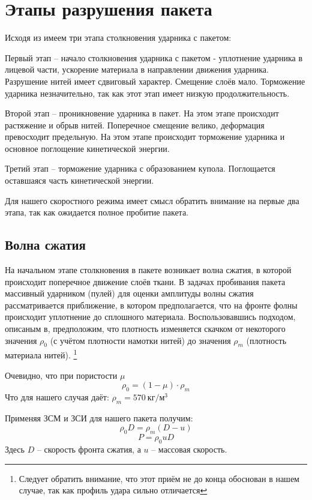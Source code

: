 \section*{Этапы разрушения пакета}
Исходя из\cite{kobylkin2014} имеем три этапа столкновения ударника с пакетом:

Первый этап -- начало столкновения ударника с пакетом - уплотнение ударника в лицевой части,
ускорение материала в направлении движения ударника.
Разрушение нитей имеет сдвиговый характер.
Смещение слоёв мало.
Торможение ударника незначительно, так как этот этап имеет низкую продолжительность.

Второй этап -- проникновение ударника в пакет.
На этом этапе происходит растяжение и обрыв нитей.
Поперечное смещение велико, деформация превосходит предельную.
На этом этапе происходит торможение ударника и основное поглощение кинетической энергии.

Третий этап -- торможение ударника с образованием купола.
Поглощается оставшаяся часть кинетической энергии.

Для нашего скоростного режима имеет смысл обратить внимание на первые два этапа, так как ожидается полное пробитие пакета.

\subsection*{Волна сжатия}
На начальном этапе столкновения в пакете возникает волна сжатия, в которой происходит поперечное движение слоёв ткани.
В задачах пробивания пакета массивный ударником (пулей) для оценки амплитуды волны сжатия рассматривается приближение,
в котором предполагается, что на фронте фолны происходит уплотнение до сплошного материала.
Воспользовавшись подходом, описаным в\cite{kobylkin2014}, предположим, что плотность изменяется скачком от некоторого
значения $\rho_0$ (с учётом плотности намотки нитей) до значения $\rho_m$ (плотность материала нитей).
\footnote{Следует обратить внимание, что этот приём не до конца обоснован в нашем случае, так как профиль удара сильно
отличается}

Очевидно, что при пористости $\mu$
\begin{equation}
    \rho_0 = (1 - \mu) \cdot \rho_m
\end{equation}
Что для нашего случая даёт: $\rho_m = 570~кг / м^3$

Применяя ЗСМ и ЗСИ для нашего пакета получим:
\begin{equation}
    \rho_0 D = \rho_m (D - u)
\end{equation}
\begin{equation}
    P = \rho_0 u D
\end{equation}
Здесь $D$ -- скорость фронта сжатия, а $u$ -- массовая скорость.

